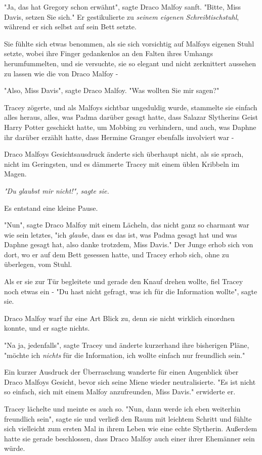 {"Ja, das hat Gregory schon erwähnt", sagte Draco Malfoy sanft. "Bitte, Miss Davis, setzen Sie sich." Er gestikulierte zu \emph{seinem eigenen Schreibtischstuhl}, während er sich selbst auf sein Bett setzte.

Sie fühlte sich etwas benommen, als sie sich vorsichtig auf Malfoys eigenen Stuhl setzte, wobei ihre Finger gedankenlos an den Falten ihres Umhangs herumfummelten, und sie versuchte, sie so elegant und nicht zerknittert aussehen zu lassen wie die von Draco Malfoy -

"Also, Miss Davis", sagte Draco Malfoy. "Was wollten Sie mir sagen?"

Tracey zögerte, und als Malfoys sichtbar ungeduldig wurde, stammelte sie einfach alles heraus, alles, was Padma darüber gesagt hatte, dass Salazar Slytherins Geist Harry Potter geschickt hatte, um Mobbing zu verhindern, und auch, was Daphne ihr darüber erzählt hatte, dass Hermine Granger ebenfalls involviert war -

Draco Malfoys Gesichtsausdruck änderte sich überhaupt nicht, als sie sprach, nicht im Geringsten, und es dämmerte Tracey mit einem üblen Kribbeln im Magen.

\emph{"Du glaubst mir nicht!", sagte sie.}

Es entstand eine kleine Pause.

"Nun", sagte Draco Malfoy mit einem Lächeln, das nicht ganz so charmant war wie sein letztes, "ich \emph{glaube}, dass es das ist, was Padma gesagt hat und was Daphne gesagt hat, also danke trotzdem, Miss Davis." Der Junge erhob sich von dort, wo er auf dem Bett gesessen hatte, und Tracey erhob sich, ohne zu überlegen, vom Stuhl.

Als er sie zur Tür begleitete und gerade den Knauf drehen wollte, fiel Tracey noch etwas ein - "Du hast nicht gefragt, was ich für die Information wollte", sagte sie.

Draco Malfoy warf ihr eine Art Blick zu, denn sie nicht wirklich einordnen konnte, und er sagte nichts.

"Na ja, jedenfalls", sagte Tracey und änderte kurzerhand ihre bisherigen Pläne, "möchte ich \emph{nichts} für die Information, ich wollte einfach nur freundlich sein."

Ein kurzer Ausdruck der Überraschung wanderte für einen Augenblick über Draco Malfoys Gesicht, bevor sich seine Miene wieder neutralisierte. "Es ist nicht so einfach, sich mit einem Malfoy anzufreunden, Miss Davis." erwiderte er.

Tracey lächelte und meinte es auch so. "Nun, dann werde ich eben weiterhin freundlich sein", sagte sie und verließ den Raum mit leichtem Schritt und fühlte sich vielleicht zum ersten Mal in ihrem Leben wie eine echte Slytherin. Außerdem hatte sie gerade beschlossen, dass Draco Malfoy auch einer ihrer Ehemänner sein würde.

}
